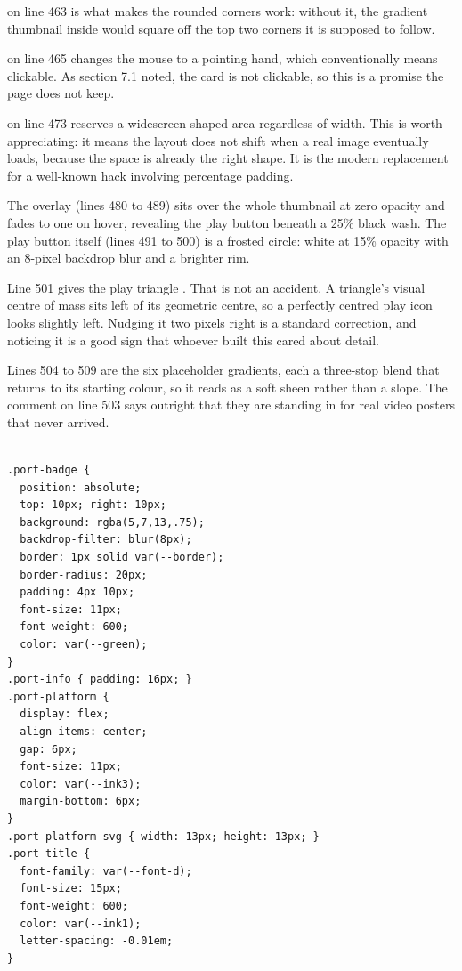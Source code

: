  on line 463 is what makes the rounded corners work: without
it, the gradient thumbnail inside would square off the top two corners it is
supposed to follow.

 on line 465 changes the mouse to a pointing hand, which
conventionally means clickable. As section 7.1 noted, the card is not clickable,
so this is a promise the page does not keep.

 on line 473 reserves a widescreen-shaped area regardless
of width. This is worth appreciating: it means the layout does not shift when a
real image eventually loads, because the space is already the right shape. It is
the modern replacement for a well-known hack involving percentage padding.

The overlay (lines 480 to 489) sits over the whole thumbnail at zero opacity and
fades to one on hover, revealing the play button beneath a 25\% black wash. The play
button itself (lines 491 to 500) is a frosted circle: white at 15\% opacity with an
8-pixel backdrop blur and a brighter rim.

Line 501 gives the play triangle . That is not an accident.
A triangle's visual centre of mass sits left of its geometric centre, so a
perfectly centred play icon looks slightly left. Nudging it two pixels right is a
standard correction, and noticing it is a good sign that whoever built this cared
about detail.

Lines 504 to 509 are the six placeholder gradients, each a three-stop blend that
returns to its starting colour, so it reads as a soft sheen rather than a slope.
The comment on line 503 says outright that they are standing in for real video
posters that never arrived.

\begin{lstlisting}[firstnumber=510,caption={\file{css/site.css}, lines 510--539}]

.port-badge {
  position: absolute;
  top: 10px; right: 10px;
  background: rgba(5,7,13,.75);
  backdrop-filter: blur(8px);
  border: 1px solid var(--border);
  border-radius: 20px;
  padding: 4px 10px;
  font-size: 11px;
  font-weight: 600;
  color: var(--green);
}
.port-info { padding: 16px; }
.port-platform {
  display: flex;
  align-items: center;
  gap: 6px;
  font-size: 11px;
  color: var(--ink3);
  margin-bottom: 6px;
}
.port-platform svg { width: 13px; height: 13px; }
.port-title {
  font-family: var(--font-d);
  font-size: 15px;
  font-weight: 600;
  color: var(--ink1);
  letter-spacing: -0.01em;
}
\end{lstlisting}

